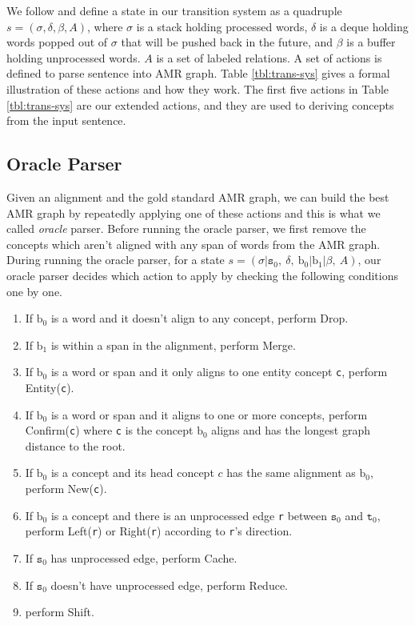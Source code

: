 \documentclass[11pt,a4paper]{article}
\begin{document}
We follow \citet{choi-mccallum:2013:ACL2013} and define a state in our transition
system as a quadruple ${ s = (\sigma, \delta, \beta, A) } $, 
where $\sigma$ is a stack holding processed words, $\delta$ is a deque holding words
popped out of $\sigma$ that will be pushed back in the future, and $\beta$
is a buffer holding unprocessed words. $A$ is a set of labeled relations.
A set of actions is defined to parse sentence into AMR graph.
Table \ref{tbl:trans-sys} gives a formal illustration of these actions and how they work.
The first five actions in Table \ref{tbl:trans-sys} are our extended actions, and
they are used to deriving concepts from
the input sentence.


\subsection{Oracle Parser}\label{sec:oracle-parser}

Given an alignment and the gold standard AMR graph, we can build
the best AMR graph by repeatedly applying one of these actions and this is what we called {\it oracle} parser.
Before running the oracle parser, we first remove the
concepts which aren't aligned with any span of words from the AMR graph.
During running the oracle parser,
for a state ${ s = (\sigma | \texttt{s}_0,\ \delta,\ \text{b}_0 | \text{b}_1 | \beta,\ A) } $, 
our oracle parser decides which action to apply by checking the following conditions one by one.
\begin{enumerate}
	\setlength\itemsep{0em}
	\item If $\text{b}_0$ is a word and it doesn't align to any concept, perform {\sc Drop}.
	\item If $\text{b}_1$ is within a span in the alignment, perform {\sc Merge}.
	\item If $\text{b}_0$ is a word or span and it only aligns to one entity concept {\tt c}, perform {\sc Entity({\tt c})}.
	\item If $\text{b}_0$ is a word or span and it aligns to one or more concepts, perform {\sc Confirm({\tt c})} where
	{\tt c} is the concept $\text{b}_0$ aligns and has the longest graph distance to the root.
	\item If $\text{b}_0$ is a concept and its head concept $c$ has the same alignment as $\text{b}_0$,
	perform {\sc New({\tt c})}.
	\item If $\text{b}_0$ is a concept and there is an unprocessed edge {\tt r} between $\texttt{s}_0$ and $\texttt{t}_0$,
	perform {\sc Left({\tt r})} or {\sc Right({\tt r})} according to {\tt r}'s direction.
	\item If $\texttt{s}_0$ has unprocessed edge, perform {\sc Cache}.
	\item If $\texttt{s}_0$ doesn't have unprocessed edge, perform {\sc Reduce}.
	\item perform {\sc Shift}.
\end{enumerate}
\end{document}
